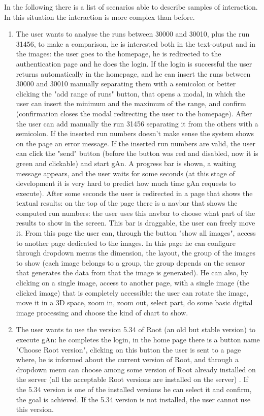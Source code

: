 In the following there is a list of scenarios able to describe samples of interaction. In this situation the interaction is more complex than before.

\begin{enumerate}

\item The user wants to analyse the runs between 30000 and 30010, plus the run 31456, to make a comparison, he is interested both in the text-output and in the images: 
the user goes to the homepage, he is redirected to the authentication page and he does the login. If the login is successful the user returns automatically in the homepage, and he can insert the runs between 30000 and 30010 manually separating them with a semicolon or better clicking the "add range of runs" button, that opens a modal, in which the user can insert the minimum and the maximum of the range, and confirm (confirmation closes the modal redirecting the user to the homepage). After the user can add manually the run 31456 separating it from the others with a semicolon. If the inserted run numbers doesn't make sense the system shows on the page an error message. If the inserted run numbers are valid, the user can click the "send" button (before the button was red and disabled, now it is green and clickable) and start gAn. A progress bar is shown, a waiting message appears, and the user waits for some seconds (at this stage of development it is very hard to predict how much time gAn requests to execute). After some seconds the user is redirected in a page that shows the textual results: on the top of the page there is a navbar that shows the computed run numbers: the user uses this navbar to choose what part of the results to show in the screen. This bar is draggable, the user can freely move it. From this page the user can, through the button "show all images", access to another page dedicated to the images. In this page he can configure through dropdown menus the dimension, the layout, the group of the images to show (each image belongs to a group, the group depends on the sensor that generates the data from that the image is generated). He can also, by clicking on a single image, access to another page, with a single image (the clicked image) that is completely accessible: the user can rotate the image, move it in a 3D space, zoom in, zoom out, select part, do some basic digital image processing and choose the kind of chart to show.   

\item The user wants to use the version 5.34 of Root (an old but stable version) to execute gAn: 
he completes the login, in the home page there is a button name "Choose Root version", clicking on this button the user is sent to a page where, he is informed about the current version of Root, and through a dropdown menu can choose among some version of Root already installed on the server (all the acceptable Root versions are installed on the server) . If the 5.34 version is one of the installed versions he can select it and confirm, the goal is achieved. If the 5.34 version is not installed, the user cannot use this version.  


\end{enumerate}
